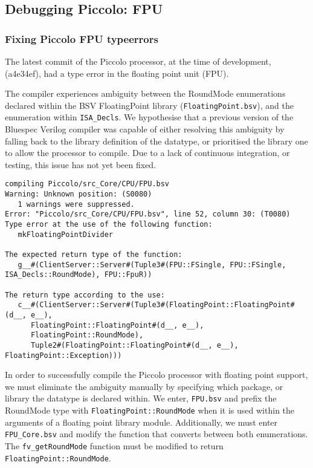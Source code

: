 \documentclass[a4paper,8pt]{report}
\begin{document}
\subsection{Debugging Piccolo: FPU}
\subsubsection{Fixing Piccolo FPU typeerrors}
The latest commit of the Piccolo processor, at the time of development, (a4e34ef), had
a type error in the floating point unit (FPU). 

The compiler experiences ambiguity between the RoundMode enumerations declared
within the BSV FloatingPoint library (\texttt{FloatingPoint.bsv}), and the
enumeration within \texttt{ISA\_Decls}. We hypothesise that a previous version
of the Bluespec Verilog compiler was capable of either resolving this ambiguity
by falling back to the library definition of the datatype, or prioritised the
library one to allow the processor to compile. Due to a lack of continuous
integration, or testing, this issue has not yet been fixed.

\begin{verbatim}
compiling Piccolo/src_Core/CPU/FPU.bsv
Warning: Unknown position: (S0080)
   1 warnings were suppressed.
Error: "Piccolo/src_Core/CPU/FPU.bsv", line 52, column 30: (T0080)
Type error at the use of the following function:
   mkFloatingPointDivider

The expected return type of the function:
   g__#(ClientServer::Server#(Tuple3#(FPU::FSingle, FPU::FSingle, ISA_Decls::RoundMode), FPU::FpuR))

The return type according to the use:
   c__#(ClientServer::Server#(Tuple3#(FloatingPoint::FloatingPoint#(d__, e__),
      FloatingPoint::FloatingPoint#(d__, e__),
      FloatingPoint::RoundMode),
      Tuple2#(FloatingPoint::FloatingPoint#(d__, e__), FloatingPoint::Exception)))
\end{verbatim}

In order to successfully compile the Piccolo processor with floating point
support, we must eliminate the ambiguity manually by specifying which package,
or library the datatype is declared within. We enter, \texttt{FPU.bsv} and prefix the
RoundMode type with \texttt{FloatingPoint::RoundMode} when it is used within the
arguments of a floating point library module. Additionally, we must enter
\texttt{FPU\_Core.bsv} and modify the function that converts between both
enumerations. The \texttt{fv\_getRoundMode} function must be modified to return
\texttt{FloatingPoint::RoundMode}.
\end{document}
